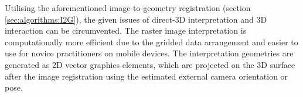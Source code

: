 \documentclass[review]{elsarticle}
\begin{document}

Utilising the aforementioned image-to-geometry registration (section \ref{sec:algorithms:I2G}), the given issues of direct-3D interpretation and 3D interaction can be circumvented. The raster image interpretation is computationally more efficient due to the gridded data arrangement and easier to use for novice practitioners on mobile devices. The interpretation geometries are generated as 2D vector graphics elements, which are projected on the 3D surface after the image registration using the estimated external camera orientation or pose. 
\end{document}
